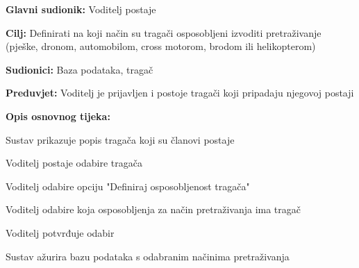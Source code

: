 					\noindent {}
					\begin{packed_item}
						
						\item \textbf{Glavni sudionik:} Voditelj postaje
						\item \textbf{Cilj:} Definirati na koji način su tragači osposobljeni izvoditi pretraživanje (pješke, dronom, automobilom, cross motorom, brodom ili helikopterom)
						\item \textbf{Sudionici:} Baza podataka, tragač
						\item \textbf{Preduvjet:} Voditelj je prijavljen i postoje tragači koji pripadaju njegovoj postaji
						\item \textbf{Opis osnovnog tijeka:}
						
						\item[] \begin{packed_enum}
							
							\item Sustav prikazuje popis tragača koji su članovi postaje
							\item Voditelj postaje odabire tragača 
							\item Voditelj odabire opciju "Definiraj osposobljenost tragača" 
							\item Voditelj odabire koja osposobljenja za način pretraživanja ima tragač
							\item Voditelj potvrđuje odabir 
							\item Sustav ažurira bazu podataka s odabranim načinima pretraživanja
						\end{packed_enum}
					\end{packed_item}
					
